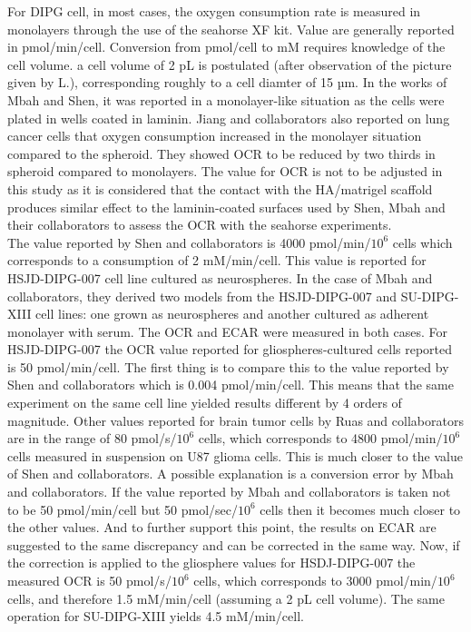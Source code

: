 \documentclass[11pt,a4paper]{article}
\begin{document}
For DIPG cell, in most cases, the oxygen consumption rate is measured in monolayers through the use of the seahorse XF kit.\cite{RomeroAgilent} Value are generally reported in pmol/min/cell. Conversion from pmol/cell to mM requires knowledge of the cell volume. a cell volume of 2 pL is postulated (after observation of the picture given by L.), corresponding roughly to a cell diamter of 15 µm. In the works of Mbah and Shen, it was reported in a monolayer-like situation as the cells were plated in wells coated in laminin.  Jiang and collaborators also reported on lung cancer cells that oxygen consumption increased in the monolayer situation compared to the spheroid. They showed OCR to be reduced by two thirds in spheroid compared to monolayers.\cite{Jiang2016} The value for OCR is not to be adjusted in this study as it is considered that the contact with the HA/matrigel scaffold produces similar effect to the laminin-coated surfaces used by Shen, Mbah and their collaborators to assess the OCR with the seahorse experiments.\\

The value reported by Shen and collaborators is 4000 pmol/min/$10^6$ cells which corresponds to a consumption of 2 mM/min/cell. This value is reported for HSJD-DIPG-007 cell line cultured as neurospheres.\cite{Shen2019} In the case of Mbah and collaborators, they derived two models from the HSJD-DIPG-007 and SU-DIPG-XIII cell lines: one grown as neurospheres and another cultured as adherent monolayer with serum. The OCR and ECAR were measured in both cases. For HSJD-DIPG-007 the OCR value reported for gliospheres-cultured cells reported is 50 pmol/min/cell. The first thing is to compare this to the value reported by Shen and collaborators which is 0.004 pmol/min/cell. This means that the same experiment on the same cell line yielded results different by 4 orders of magnitude. Other values reported for brain tumor cells by Ruas and collaborators are in the range of 80 pmol/s/$10^6$ cells, which corresponds to 4800 pmol/min/$10^6$ cells measured in suspension on U87 glioma cells. This is much closer to the value of Shen and collaborators. A possible explanation is a conversion error by Mbah and collaborators. If the value reported by Mbah and collaborators is taken not to be 50 pmol/min/cell but 50 pmol/sec/$10^6$ cells then it becomes much closer to the other values. And to further support this point, the results on ECAR are suggested to the same discrepancy and can be corrected in the same way. Now, if the correction is applied to the gliosphere values for HSDJ-DIPG-007 the measured OCR is 50 pmol/s/$10^6$ cells, which corresponds to 3000 pmol/min/$10^6$ cells, and therefore 1.5 mM/min/cell (assuming a 2 pL cell volume). The same operation for SU-DIPG-XIII yields 4.5 mM/min/cell.\\
\end{document}
